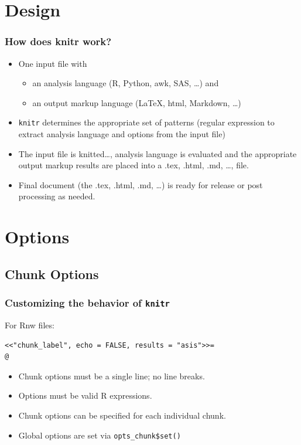 \documentclass[t]{beamer}\usepackage[]{graphicx}\usepackage[]{color}
\begin{document}
\section{Design}
\begin{frame}[fragile]
  \frametitle{How does knitr work?}
  \begin{itemize}
    \item One input file with 
      \begin{itemize}
        \item an analysis language (R, Python, awk, SAS, \ldots) and 
        \item an output markup language (\LaTeX, html, Markdown, \ldots)
      \end{itemize}

    \item {\tt knitr} determines the appropriate set of patterns (regular
      expression to extract analysis language and options from the input file)

    \item The input file is knitted\ldots, analysis language is evaluated and
      the appropriate output markup results are placed into a .tex, .html, .md,
      \ldots, file.

    \item Final document (the .tex, .html, .md, \ldots)  is ready for release or
      post processing as needed.

  \end{itemize}
\end{frame} 


\section{Options}
\subsection{Chunk Options}
\begin{frame}[fragile]
  \frametitle{Customizing the behavior of {\tt knitr}}
  For Rnw files:

  \begin{verbatim}<<"chunk_label", echo = FALSE, results = "asis">>=
@
  \end{verbatim}
  \begin{itemize}
    \item Chunk options must be a single line; no line breaks.  
    \item Options must be valid R expressions.
    \item Chunk options can be specified for each individual chunk.
    \item Global options are set via \verb;opts_chunk$set();
  \end{itemize}
\end{frame}
\end{document}
